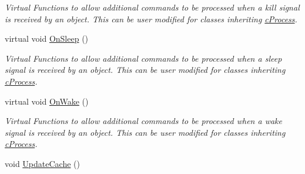 \begin{DoxyCompactItemize}
\begin{DoxyCompactList}\small\item\em Virtual Functions to allow additional commands to be processed when a kill signal is received by an object. This can be user modified for classes inheriting \hyperlink{classc_process}{cProcess}. \end{DoxyCompactList}\item 
\hypertarget{classc_render_object_a59b3e3fc3d973b88483db3a802fc4744}{
virtual void \hyperlink{classc_render_object_a59b3e3fc3d973b88483db3a802fc4744}{OnSleep} ()}
\label{classc_render_object_a59b3e3fc3d973b88483db3a802fc4744}

\begin{DoxyCompactList}\small\item\em Virtual Functions to allow additional commands to be processed when a sleep signal is received by an object. This can be user modified for classes inheriting \hyperlink{classc_process}{cProcess}. \end{DoxyCompactList}\item 
\hypertarget{classc_render_object_ae64dcff609168192347a8fd833325bcb}{
virtual void \hyperlink{classc_render_object_ae64dcff609168192347a8fd833325bcb}{OnWake} ()}
\label{classc_render_object_ae64dcff609168192347a8fd833325bcb}

\begin{DoxyCompactList}\small\item\em Virtual Functions to allow additional commands to be processed when a wake signal is received by an object. This can be user modified for classes inheriting \hyperlink{classc_process}{cProcess}. \end{DoxyCompactList}\item 
\hypertarget{classc_render_object_aeeb8da742f1a844179a74a99e9aa4433}{
void \hyperlink{classc_render_object_aeeb8da742f1a844179a74a99e9aa4433}{UpdateCache} ()}
\label{classc_render_object_aeeb8da742f1a844179a74a99e9aa4433}


\end{DoxyCompactItemize}
